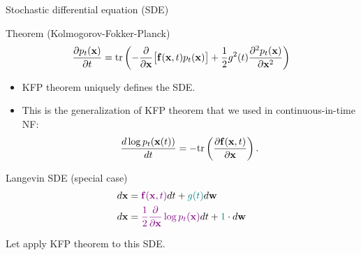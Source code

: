\begin{frame}{Stochastic differential equation (SDE)}
 	\begin{block}{Theorem (Kolmogorov-Fokker-Planck)}
 		\vspace{-0.2cm}
 		\[
 			\frac{\partial p_t(\mathbf{x})}{\partial t} = \text{tr}\left(- \frac{\partial}{\partial \mathbf{x}} \bigl[ \mathbf{f}(\mathbf{x}, t) p_t(\mathbf{x})\bigr] + \frac{1}{2} g^2(t) \frac{\partial^2 p_t(\mathbf{x})}{\partial \mathbf{x}^2} \right)
 		\]
 	\end{block}
 	 \begin{itemize}
 	 	\item KFP theorem uniquely defines the SDE.
 		 \item This is the generalization of KFP theorem that we used in continuous-in-time NF:
 	 	\[
 	 		\frac{d \log p_t(\mathbf{x}(t))}{d t} = - \text{tr} \left( \frac{\partial \mathbf{f}(\mathbf{x}, t)}{\partial \mathbf{x}} \right).
 	 	\]
 	 \end{itemize}
	\vspace{-0.3cm}
 	\begin{block}{Langevin SDE (special case)}
 		\vspace{-0.6cm}
 		\begin{align*}
 			d\mathbf{x} &= {\color{violet}\mathbf{f}(\mathbf{x}, t)} dt + {\color{teal}g(t)} d \mathbf{w} \\
 			d \mathbf{x} &= {\color{violet}\frac{1}{2} \frac{\partial}{\partial \mathbf{x}} \log p_t(\mathbf{x})} d t + {\color{teal} 1 } \cdot d \mathbf{w}
 		\end{align*}
 		\vspace{-0.3cm}
 	\end{block}
 	Let apply KFP theorem to this SDE.
\end{frame}
